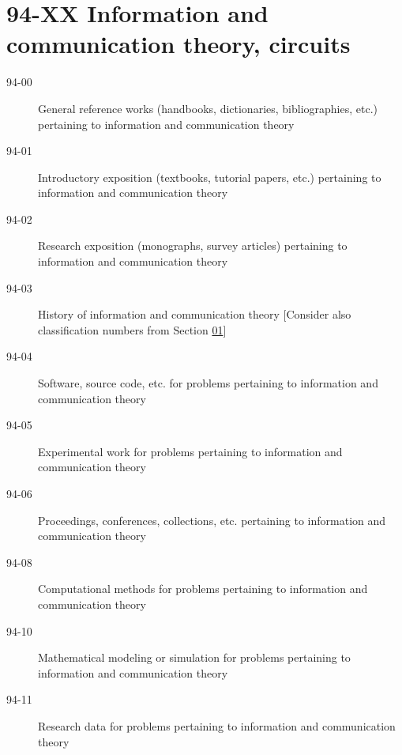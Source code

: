 \documentclass[letterpaper]{article}
\begin{document}
\section*{94-XX Information and communication theory, circuits }\label{94-XX}
\begin{description}
\item [94-00]\label{94-00} General reference works (handbooks, dictionaries, bibliographies, etc.) pertaining to information and communication theory
\item [94-01]\label{94-01} Introductory exposition (textbooks, tutorial papers, etc.) pertaining to information and communication theory
\item [94-02]\label{94-02} Research exposition (monographs, survey articles) pertaining to information and communication theory
\item [94-03]\label{94-03} History of information and communication theory [Consider also classification numbers from Section \hyperref[01-XX]{01}]
\item [94-04]\label{94-04} Software, source code, etc. for problems pertaining to information and communication theory
\item [94-05]\label{94-05} Experimental work for problems pertaining to information and communication theory
\item [94-06]\label{94-06} Proceedings, conferences, collections, etc. pertaining to information and communication theory
\item [94-08]\label{94-08} Computational methods for problems pertaining to information and communication theory
\item [94-10]\label{94-10} Mathematical modeling or simulation for problems pertaining to information and communication theory
\item [94-11]\label{94-11} Research data for problems pertaining to information and communication theory
\end{description}
\end{document}
